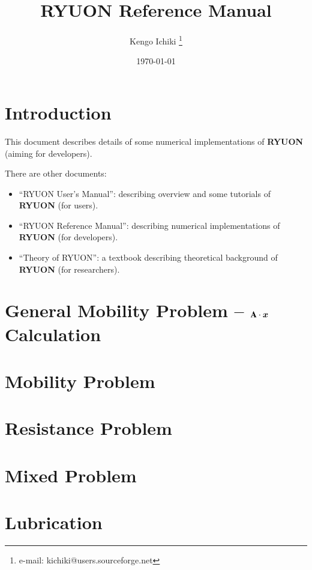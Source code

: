 \documentclass[twocolumn]{book}
\begin{document}
\title{RYUON Reference Manual}
\author{Kengo Ichiki
 \thanks{e-mail: kichiki@users.sourceforge.net}}
\date{\today}

\maketitle

\tableofcontents

\chapter{Introduction}
This document describes details of some numerical implementations 
of {\bf RYUON} (aiming for developers).


There are other documents:
\begin{itemize}
\item ``RYUON User's Manual'':
  describing overview and some tutorials of {\bf RYUON} (for users).
\item ``RYUON Reference Manual'':
  describing numerical implementations 
  of {\bf RYUON} (for developers).
\item ``Theory of RYUON'':
  a textbook describing theoretical background of {\bf RYUON}
  (for researchers).
\end{itemize}


\chapter{General Mobility Problem -- ${\bf A}\cdot\bm{x}$ Calculation}
\label{chp:atimes}


\chapter{Mobility Problem}
\label{chp:mob}


\chapter{Resistance Problem}
\label{chp:res}


\chapter{Mixed Problem}
\label{chp:mix}


\chapter{Lubrication}
\label{chp:lub}
\end{document}
